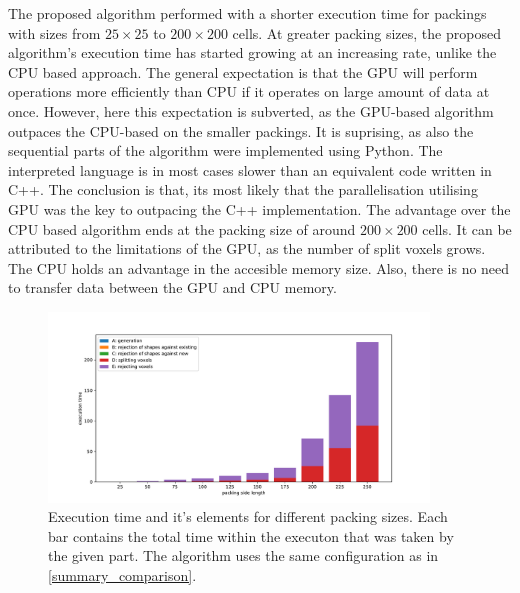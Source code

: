\documentclass[12pt, oneside]{report}
\begin{document}
The proposed algorithm performed with a shorter execution time for packings with sizes from $25 \times 25$ to $200 \times 200$ cells. At greater packing sizes, the proposed algorithm's execution time has started growing at an increasing rate, unlike the CPU based approach. \newline
The general expectation is that the GPU will perform operations more efficiently than CPU if it operates on large amount of data at once. However, here this expectation is subverted, as the GPU-based algorithm outpaces the CPU-based on the smaller packings. It is suprising, as also the sequential parts of the algorithm were implemented using Python. The interpreted language is in most cases slower than an equivalent code written in C++. The conclusion is that, its most likely that the parallelisation utilising GPU was the key to outpacing the C++ implementation.\newline
The advantage over the CPU based algorithm ends at the packing size of around $200 \times 200$ cells. It can be attributed to the limitations of the GPU, as the number of split voxels grows. The CPU holds an advantage in the accesible memory size. Also, there is no need to transfer data between the GPU and CPU memory.

\begin{figure}[H]
  \centering
	\includegraphics[width=0.9\textwidth,keepaspectratio]{Images/SummaryComparison/parts_total.pdf}
	\caption{Execution time and it's elements for different packing sizes. Each bar contains the total time within the executon that was taken by the given part. The algorithm uses the same configuration as in \ref{summary_comparison}. }
	\label{summary_times_total}
\end{figure}
\end{document}
